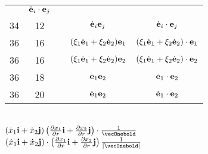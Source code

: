 \documentclass[a4paper,11pt]{article}
\begin{document}
\begin{center}
\begin{tabular}{|c|c|c|c|c|}
           & $\dot{ \mathbf{e} }_{ i } \cdot \mathbf{e}_{ j }$ \\
    34  & 12 & & $\dot{ \mathbf{e} }_{ i } \mathbf{e}_{ j }$
           & $\dot{ \mathbf{e} }_{ i } \cdot \mathbf{e}_{ j }$ \\
    36  & 16 & & $( \xi_{ 1 } \dot{ \mathbf{e} }_{ 1 }
                 + \xi_{ 2 } \dot{ \mathbf{e} }_{ 2 }  ) \mathbf{e}_{ 1 }$
           & $( \xi_{ 1 } \dot{ \mathbf{e} }_{ 1 }
             + \xi_{ 2 } \dot{ \mathbf{e} }_{ 2 }  ) \cdot \mathbf{e}_{ 1 }$ \\
    36  & 16 & & $( \xi_{ 1 } \dot{ \mathbf{e} }_{ 1 }
                 + \xi_{ 2 } \dot{ \mathbf{e} }_{ 2 }  ) \mathbf{e}_{ 2 }$
           & $( \xi_{ 1 } \dot{ \mathbf{e} }_{ 1 }
             + \xi_{ 2 } \dot{ \mathbf{e} }_{ 2 }  ) \cdot \mathbf{e}_{ 2 }$ \\
    36  & 18 & & $\dot{ \mathbf{e} }_{ 1 } \mathbf{e}_{ 2 }$
           & $\dot{ \mathbf{e} }_{ 1 } \cdot \mathbf{e}_{ 2 }$ \\
    36  & 20 & & $\dot{ \mathbf{e} }_{ 1 } \mathbf{e}_{ 2 }$
           & $\dot{ \mathbf{e} }_{ 1 } \cdot \mathbf{e}_{ 2 }$ \\
    \hline
  \end{tabular}

\end{center}


\noindent
{} \\[0.3em]
\Jest
$( \dot{ x }_{ 1 } \vecibold + \dot{ x }_{ 2 } \vecjbold )
\left( \frac{ \partial x_{ 1 } }{ \partial r } \vecibold
  + \frac{ \partial x_{ 2 } }{ \partial r } \vecjbold \right)
\cdot \frac{ 1 }{ \vecOnebold }$ \\[0.5em]
\Powin
$( \dot{ x }_{ 1 } \vecibold + \dot{ x }_{ 2 } \vecjbold )
\cdot \left( \frac{ \partial x_{ 1 } }{ \partial r } \vecibold
  + \frac{ \partial x_{ 2 } }{ \partial r } \vecjbold \right)
\frac{ 1 }{ | \vecOnebold | }$ \\


\vspace{\spaceTwo}








\end{document}
